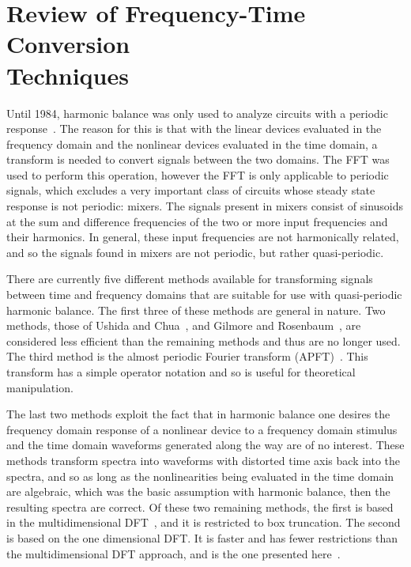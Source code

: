 \section{Review of Frequency-Time Conversion \\
Techniques}

Until 1984, harmonic balance was only used to analyze circuits with a
periodic response~\cite{kundert:vincentelli:90}. The reason for this
is that with the linear devices evaluated in the frequency domain and
the nonlinear devices evaluated in the time domain, a transform is
needed to convert signals between the two domains. The FFT was used to
perform this operation, however the FFT is only applicable to periodic
signals, which excludes a very important class of circuits whose
steady state response is not periodic: mixers. The signals present in
mixers consist of sinusoids at the sum and difference frequencies of
the two or more input frequencies and their harmonics. In general,
these input frequencies are not harmonically related, and so the
signals found in mixers are not periodic, but rather quasi-periodic.

There are currently five different methods available for transforming
signals between time and frequency domains that are suitable for use
with quasi-periodic harmonic balance. The first three of these methods
are general in nature. Two methods, those of Ushida and
Chua~\cite{ushida:84}, and Gilmore and Rosenbaum~\cite{gilmore:84},
are considered less efficient than the remaining methods and thus are
no longer used. The third method is the almost periodic Fourier
transform (APFT)~\cite{kundert:vincentelli:90}. This transform has a
simple operator notation and so is useful for theoretical
manipulation.

The last two methods exploit the fact that in harmonic balance one
desires the frequency domain response of a nonlinear device to a
frequency domain stimulus and the time domain waveforms generated
along the way are of no interest. These methods transform spectra into
waveforms with distorted time axis back into the spectra, and so as
long as the nonlinearities being evaluated in the time domain are
algebraic, which was the basic assumption with harmonic balance, then
the resulting spectra are correct. Of these two remaining methods, the
first is based in the multidimensional DFT~\cite{bava:82,ushida:87},
and it is restricted to box truncation. The second is based on the one
dimensional DFT. It is faster and has fewer restrictions than the
multidimensional DFT approach, and is the one presented
here~\cite{kundert:vincentelli:90}.

